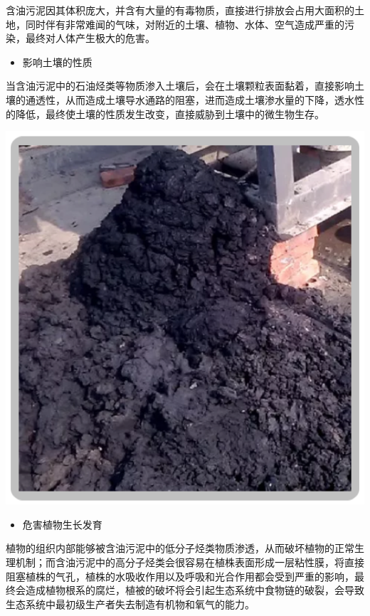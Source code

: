 \documentclass[]{book}
\providecommand{\tightlist}{%
  \setlength{\itemsep}{0pt}\setlength{\parskip}{0pt}}
\begin{document}
含油污泥因其体积庞大，并含有大量的有毒物质，直接进行排放会占用大面积的土地，同时伴有非常难闻的气味，对附近的土壤、植物、水体、空气造成严重的污染，最终对人体产生极大的危害。

\begin{itemize}
\tightlist
\item
  影响土壤的性质
\end{itemize}

当含油污泥中的石油烃类等物质渗入土壤后，会在土壤颗粒表面黏着，直接影响土壤的通透性，从而造成土壤导水通路的阻塞，进而造成土壤渗水量的下降，透水性的降低，最终使土壤的性质发生改变，直接威胁到土壤中的微生物生存。

\includegraphics[width=8in]{images/youni4}

\begin{itemize}
\tightlist
\item
  危害植物生长发育
\end{itemize}

植物的组织内部能够被含油污泥中的低分子烃类物质渗透，从而破坏植物的正常生理机制；而含油污泥中的高分子烃类会很容易在植株表面形成一层粘性膜，将直接阻塞植株的气孔，植株的水吸收作用以及呼吸和光合作用都会受到严重的影响，最终会造成植物根系的腐烂，植被的破坏将会引起生态系统中食物链的破裂，会导致生态系统中最初级生产者失去制造有机物和氧气的能力。
\end{document}
